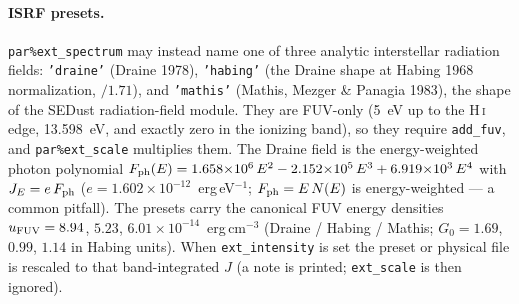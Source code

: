 \documentclass[english,a4paper]{my_memo}
\newcommand{\code}[1]{\texttt{#1}}
\begin{document}
\paragraph{ISRF presets.}  \code{par\%ext\_spectrum} may instead name one
of three analytic interstellar radiation fields: \code{'draine'}
(Draine 1978), \code{'habing'} (the Draine shape at Habing 1968
normalization, $/1.71$), and \code{'mathis'} (Mathis, Mezger \&
Panagia 1983), the shape of the SEDust radiation-field module.  They
are FUV-only (5~eV up to the H\,\textsc{i} edge, 13.598~eV, and exactly
zero in the ionizing band), so they
require \code{add\_fuv}, and \code{par\%ext\_scale} multiplies them.  The
Draine field is the energy-weighted photon polynomial
$F_{\rm ph}(E) = 1.658{\times}10^{6}\,E^{2} - 2.152{\times}10^{5}\,E^{3}
+ 6.919{\times}10^{3}\,E^{4}$ with $J_E = e\,F_{\rm ph}$
($e = 1.602{\times}10^{-12}$~erg\,eV$^{-1}$; $F_{\rm ph} = E\,N(E)$ is
energy-weighted --- a common pitfall).  The presets carry the canonical
FUV energy densities $u_{\rm FUV} = 8.94$, $5.23$,
$6.01{\times}10^{-14}$~erg\,cm$^{-3}$ (Draine / Habing / Mathis;
$G_0 = 1.69$, $0.99$, $1.14$ in Habing units).  When \code{ext\_intensity}
is set the preset or physical file is rescaled to that band-integrated
$J$ (a note is printed; \code{ext\_scale} is then ignored).
\end{document}
